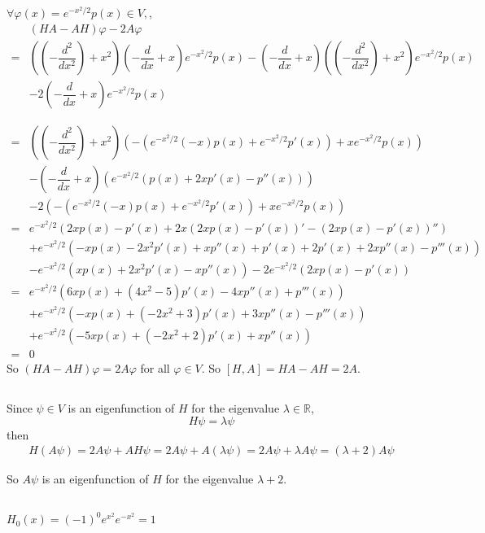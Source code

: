 \documentclass[a4paper,12pt,titlepage]{article}
\begin{document}
\subsection{}
$\forall \varphi(x)=e^{-x^2/2}p(x)\in V,$,
\begin{align*}
&(HA-AH)\varphi-2A\varphi\\
=&((-\dfrac{d^2}{dx^2})+x^2)(-\dfrac{d}{dx}+x)e^{-x^2/2}p(x)-(-\dfrac{d}{dx}+x)((-\dfrac{d^2}{dx^2})+x^2)e^{-x^2/2}p(x)\\
&-2(-\dfrac{d}{dx}+x)e^{-x^2/2}p(x)
\end{align*}

\begin{align*}
=&((-\dfrac{d^2}{dx^2})+x^2)(-(e^{-x^2/2}(-x)p(x)+e^{-x^2/2}p'(x))+xe^{-x^2/2}p(x))\\
&-(-\dfrac{d}{dx}+x)(e^{-x^2/2}(p(x)+2xp'(x)-p''(x)))\\
&-2(-(e^{-x^2/2}(-x)p(x)+e^{-x^2/2}p'(x))+xe^{-x^2/2}p(x))\\
=&e^{-x^2/2}(2xp(x)-p'(x)+2x(2xp(x)-p'(x))'-(2xp(x)-p'(x))'')\\
&+e^{-x^2/2}(-xp(x)-2x^2p'(x)+xp''(x)+p'(x)+2p'(x)+2xp''(x)-p'''(x))\\
&-e^{-x^2/2}(xp(x)+2x^2p'(x)-xp''(x))-2e^{-x^2/2}(2xp(x)-p'(x))\\
=&e^{-x^2/2}(6xp(x)+(4x^2-5)p'(x)-4xp''(x)+p'''(x))\\
&+e^{-x^2/2}(-xp(x)+(-2x^2+3)p'(x)+3xp''(x)-p'''(x))\\
&+e^{-x^2/2}(-5xp(x)+(-2x^2+2)p'(x)+xp''(x))\\
=&0
\end{align*}
So $(HA-AH)\varphi=2A\varphi$ for all $\varphi\in V$. So $[H,A]=HA-AH=2A$.

\subsection{}
Since $\psi\in V $ is an eigenfunction of $H$ for the eigenvalue $\lambda\in\mathbb{R}$, 
$$H\psi=\lambda\psi$$
then 
\begin{align*}
H(A\psi)=2A\psi+AH\psi=2A\psi+A(\lambda\psi)=2A\psi+\lambda A\psi=(\lambda+2)A\psi
\end{align*}

So $A\psi$ is an eigenfunction of $H$ for the eigenvalue $\lambda+2$.


\subsection{}
$H_0(x)=(-1)^0e^{x^2}e^{-x^2}=1$
\end{document}
